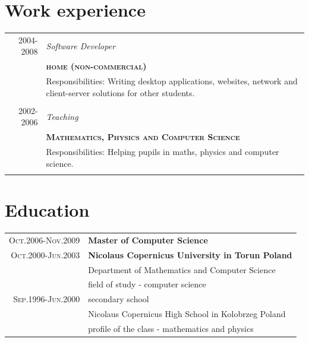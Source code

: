 \documentclass[a4paper,12pt]{article}
\begin{document}
\section{Work experience}
\begin{tabular}{r|p{13cm}}
     \textsc{2004-2008}
	&\emph{Software Developer}\\
	&\textsc{\textbf{home (non-commercial)}}\\
	&\footnotesize{Responsibilities: Writing desktop applications, websites, network and client-server solutions for other students.}\\
	\multicolumn{2}{c}{}\\

	\textsc{2002-2006}
	&\emph{Teaching}\\
	&\textsc{\textbf{Mathematics, Physics and Computer Science}}\\
	&\footnotesize{Responsibilities: Helping pupils in maths, physics and computer science.}\\
	\multicolumn{2}{c}{}\\
\end{tabular}

\section{Education}
\begin{tabular}{r|p{11cm}}
	\textsc{Oct.2006-Nov.2009}
		&  \textbf{Master of Computer Science}\\
	\textsc{Oct.2000-Jun.2003}
		&  \textbf{Nicolaus Copernicus University in Torun Poland}\\
		& Department of Mathematics and Computer Science\\
		& field of study - computer science\\

	\textsc{Sep.1996-Jun.2000}
		& secondary school\\
		& Nicolaus Copernicus High School in Kolobrzeg Poland\\
		& profile of the class - mathematics and physics\\
\end{tabular}


\end{document}
